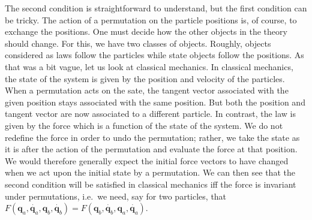 \documentclass[11pt]{article}
\theoremstyle{remark}
\begin{document}
The second condition is straightforward to understand, but the first
condition can be tricky.  The action of a permutation on the particle
positions is, of course, to exchange the positions. One must decide
how the other objects
in the theory should change. For this, we have two classes of
objects. Roughly, objects considered as laws follow the particles while 
state objects follow the positions.
As that was a bit vague, let us look at classical mechanics.
In classical
mechanics, the state of the system is given by the position and
velocity of the particles. When a permutation acts on the sate, the
tangent vector associated with the given position stays associated
with the same position. But both the position and tangent vector are
now associated to a different particle. In contrast, 
the law is given by the force which is a function of the state of the
system. 
We do not redefine the force in order
to undo the permutation; rather, we take the state as it is after the
action of the permutation and evaluate the force at that position. 
We would therefore generally expect the
initial force vectors to have changed when we act upon the initial
state by a permutation. We can then see that the second condition will be
satisfied in classical mechanics iff the force is invariant under
permutations, i.e.\ we need, say for two particles, that 
$F(\ensuremath{\boldsymbol{q}}_a, \dot{\ensuremath{\boldsymbol{q}}_a}, \ensuremath{\boldsymbol{q}}_b, \dot{\ensuremath{\boldsymbol{q}}_b})
= F(\ensuremath{\boldsymbol{q}}_b, \dot{\ensuremath{\boldsymbol{q}}_b}, \ensuremath{\boldsymbol{q}}_a, \dot{\ensuremath{\boldsymbol{q}}_a}).$
\end{document}
